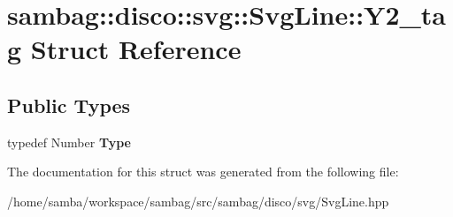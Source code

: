 \hypertarget{structsambag_1_1disco_1_1svg_1_1_svg_line_1_1_y2__tag}{
\section{sambag::disco::svg::SvgLine::Y2\_\-tag Struct Reference}
\label{structsambag_1_1disco_1_1svg_1_1_svg_line_1_1_y2__tag}
}
\subsection*{Public Types}
\begin{DoxyCompactItemize}
\item 
\hypertarget{structsambag_1_1disco_1_1svg_1_1_svg_line_1_1_y2__tag_ad07d92130c3257ae6a37d478b77d760a}{
typedef Number {\bfseries Type}}
\label{structsambag_1_1disco_1_1svg_1_1_svg_line_1_1_y2__tag_ad07d92130c3257ae6a37d478b77d760a}

\end{DoxyCompactItemize}


The documentation for this struct was generated from the following file:\begin{DoxyCompactItemize}
\item 
/home/samba/workspace/sambag/src/sambag/disco/svg/SvgLine.hpp\end{DoxyCompactItemize}
